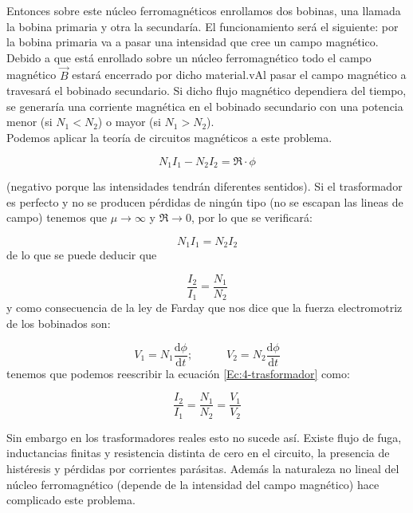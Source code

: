 \documentclass[12pt]{article}
\newcommand{\D}{\mathrm{d}}
\newcommand{\tquad}{\quad \quad \quad}
\begin{document}
Entonces sobre este núcleo ferromagnéticos enrollamos dos bobinas, una llamada la bobina primaria y otra la secundaría. El funcionamiento será el siguiente: por la bobina primaria va a pasar una intensidad que cree un campo magnético. Debido a que está enrollado sobre un núcleo ferromagnético todo el campo magnético $\vec{B}$ estará encerrado por dicho material.vAl pasar el campo magnético a travesará el bobinado secundario. Si dicho flujo magnético dependiera del tiempo, se generaría una corriente magnética en el bobinado secundario con una potencia menor (si $N_1 < N_2$) o mayor (si $N_1 > N_2$).  \\

Podemos aplicar la teoría de circuitos magnéticos a este problema.

\begin{equation}
N_1 I_1 - N_2 I_2 = \mathfrak{R} \cdot \phi
\end{equation}

(negativo porque las intensidades tendrán diferentes sentidos). Si el trasformador es perfecto y no se producen pérdidas de ningún tipo (no se escapan las lineas de campo) tenemos que $\mu \rightarrow \infty$ y $\mathfrak{R} \rightarrow 0$, por lo que se verificará:

\begin{equation}
N_1 I_1 = N_2 I_2
\end{equation}
de lo que se puede deducir que

\begin{equation}
\dfrac{I_2}{I_1} = \dfrac{N_1}{N_2} \label{Ec:4-trasformador}
\end{equation}
y como consecuencia de la ley de Farday que nos dice que la fuerza electromotriz de los bobinados son:

\begin{equation}
V_1 = N_1 \dfrac{\D \phi}{\D t}; \tquad V_2 = N_2 \dfrac{\D \phi}{\D t}
\end{equation}
tenemos que podemos reescribir la ecuación \ref{Ec:4-trasformador} como:


\begin{equation}
\dfrac{I_2}{I_1} = \dfrac{N_1}{N_2} = \dfrac{V_1}{V_2}
\end{equation}

Sin embargo en los trasformadores reales esto no sucede así. Existe flujo de fuga, inductancias finitas y resistencia distinta de cero en el circuito, la presencia de histéresis y pérdidas por corrientes parásitas. Además la naturaleza no lineal del núcleo ferromagnético (depende de la intensidad del campo magnético) hace complicado este problema. \\
\end{document}
